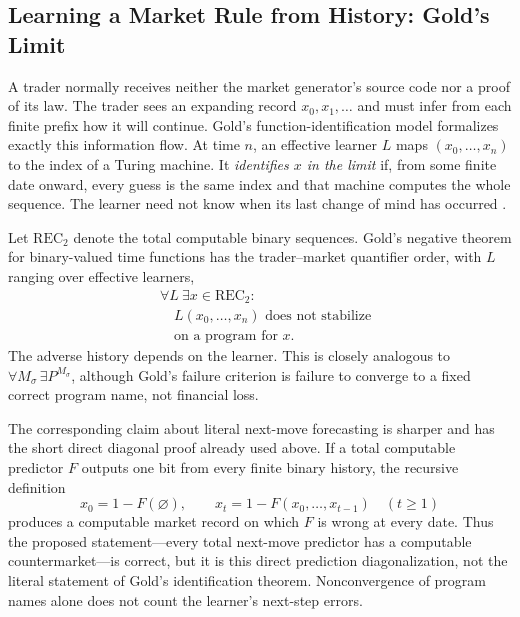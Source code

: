 \documentclass[aps,pra,reprint,superscriptaddress,amsmath,amssymb,floatfix]{revtex4-2}
\theoremstyle{plain}
\theoremstyle{definition}
\theoremstyle{remark}
\begin{document}
\subsection{Learning a Market Rule from History: Gold's Limit}

A trader normally receives neither the market generator's source code nor a
proof of its law. The trader sees an expanding record
\(x_0,x_1,\ldots\) and must infer from each finite prefix how it will continue.
Gold's function-identification model formalizes exactly this information flow.
At time \(n\), an effective learner \(L\) maps
\((x_0,\ldots,x_n)\) to the index of a Turing machine. It
\emph{identifies \(x\) in the limit} if, from some finite date onward, every
guess is the same index and that machine computes the whole sequence. The
learner need not know when its last change of mind has occurred
\cite{go-65,go-67}.

Let \(\mathrm{REC}_2\) denote the total computable binary sequences. Gold's
negative theorem for binary-valued time functions has the trader--market
quantifier order, with \(L\) ranging over effective learners,
\begin{equation}
  \begin{aligned}
  &\forall L\ \exists x\in\mathrm{REC}_2: \\
  &\quad L(x_0,\ldots,x_n)\text{ does not stabilize}\\
  &\quad \text{on a program for }x .
  \end{aligned}
  \label{eq:goldquantifiers}
\end{equation}
The adverse history depends on the learner. This is closely analogous to
\(\forall M_\sigma\,\exists P^{M_\sigma}\), although Gold's failure criterion
is failure to converge to a fixed correct program name, not financial loss.

The corresponding claim about literal next-move forecasting is sharper and
has the short direct diagonal proof already used above. If a total computable
predictor \(F\) outputs one bit from every finite binary history, the recursive
definition
\[
  x_0=1-F(\varnothing),
  \qquad
  x_t=1-F(x_0,\ldots,x_{t-1})\quad(t\geq1)
\]
produces a computable market record on which \(F\) is wrong at every date.
Thus the proposed statement---every total next-move predictor has a computable
countermarket---is correct, but it is this direct prediction diagonalization,
not the literal statement of Gold's identification theorem. Nonconvergence of
program names alone does not count the learner's next-step errors.
\end{document}
